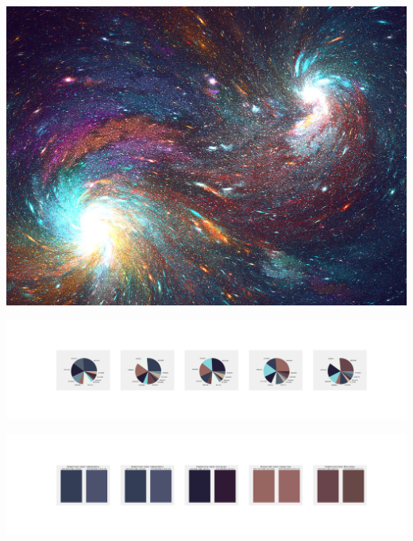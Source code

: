 \documentclass[11pt]{article}
\begin{document}
\begin{landscape}
    \begin{center}
    \includegraphics[width=\textwidth]{./nbimg/file (205).jpg}
    \end{center}

    \begin{center}
    \includegraphics[width=250mm]{./nbimg/pie-118.jpg}
    \end{center}

    \begin{center}
    \includegraphics[width=250mm]{./nbimg/peak-118.jpg}
    \end{center}
    


\end{landscape}
\end{document}
